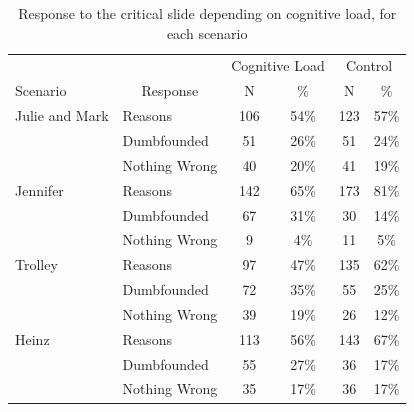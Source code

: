 \documentclass[
  man,floatsintext]{apa6}
\begin{document}
\begin{table}[tbp]

\begin{center}
\begin{threeparttable}

\caption{\label{tab:tabS6tab1dumb1allIncest}Response to the critical slide depending on cognitive load, for each scenario}

\begin{tabular}{llcccc}
\toprule
 &  & \multicolumn{2}{c}{Cognitive Load} & \multicolumn{2}{c}{Control} \\
\cmidrule(r){3-4} \cmidrule(r){5-6}
Scenario & \multicolumn{1}{c}{Response} & \multicolumn{1}{c}{N} & \multicolumn{1}{c}{\%} & \multicolumn{1}{c}{N} & \multicolumn{1}{c}{\%}\\
\midrule
Julie and Mark & Reasons & 106 & 54\% & 123 & 57\%\\
 & Dumbfounded & 51 & 26\% & 51 & 24\%\\
 & Nothing Wrong & 40 & 20\% & 41 & 19\%\\
Jennifer & Reasons & 142 & 65\% & 173 & 81\%\\
 & Dumbfounded & 67 & 31\% & 30 & 14\%\\
 & Nothing Wrong & 9 & 4\% & 11 & 5\%\\
Trolley & Reasons & 97 & 47\% & 135 & 62\%\\
 & Dumbfounded & 72 & 35\% & 55 & 25\%\\
 & Nothing Wrong & 39 & 19\% & 26 & 12\%\\
Heinz & Reasons & 113 & 56\% & 143 & 67\%\\
 & Dumbfounded & 55 & 27\% & 36 & 17\%\\
 & Nothing Wrong & 35 & 17\% & 36 & 17\%\\
\bottomrule
\end{tabular}

\end{threeparttable}
\end{center}

\end{table}
\end{document}
